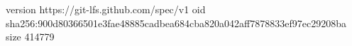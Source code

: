 version https://git-lfs.github.com/spec/v1
oid sha256:900d80366501e3fae48885cadbea684cba820a042aff7878833ef97ec29208ba
size 414779
